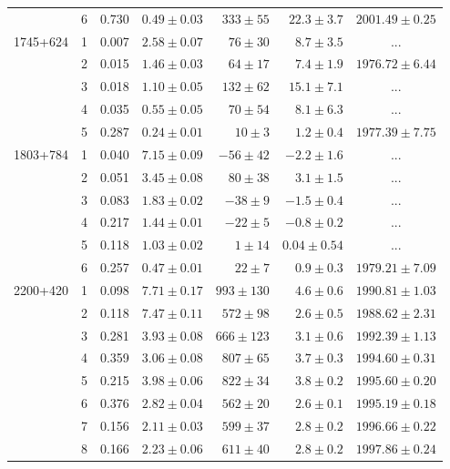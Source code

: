 \begin{table}
\begin{SingleSpace}
\begin{tabular}{l c r r r r c}
         &  6 &  0.730 & $ 0.49\pm 0.03$ & $ 333\pm  55$ & $ 22.3\pm 3.7$ & $2001.49\pm   0.25$ \\
1745+624 &  1 &  0.007 & $ 2.58\pm 0.07$ & $  76\pm  30$ & $  8.7\pm 3.5$ & ... \\
         &  2 &  0.015 & $ 1.46\pm 0.03$ & $  64\pm  17$ & $  7.4\pm 1.9$ & $1976.72\pm   6.44$ \\
         &  3 &  0.018 & $ 1.10\pm 0.05$ & $ 132\pm  62$ & $ 15.1\pm 7.1$ & ... \\
         &  4 &  0.035 & $ 0.55\pm 0.05$ & $  70\pm  54$ & $  8.1\pm 6.3$ & ... \\
         &  5 &  0.287 & $ 0.24\pm 0.01$ & $  10\pm   3$ & $  1.2\pm 0.4$ & $1977.39\pm   7.75$ \\
1803+784 &  1 &  0.040 & $ 7.15\pm 0.09$ & $ -56\pm  42$ & $ -2.2\pm 1.6$ & ... \\
         &  2 &  0.051 & $ 3.45\pm 0.08$ & $  80\pm  38$ & $  3.1\pm 1.5$ & ... \\
         &  3 &  0.083 & $ 1.83\pm 0.02$ & $ -38\pm   9$ & $ -1.5\pm 0.4$ & ... \\
         &  4 &  0.217 & $ 1.44\pm 0.01$ & $ -22\pm   5$ & $ -0.8\pm 0.2$ & ... \\
         &  5 &  0.118 & $ 1.03\pm 0.02$ & $   1\pm  14$ & $  0.04\pm 0.54$ & ... \\
         &  6 &  0.257 & $ 0.47\pm 0.01$ & $  22\pm   7$ & $  0.9\pm 0.3$ & $1979.21\pm   7.09$ \\
2200+420 &  1 &  0.098 & $ 7.71\pm 0.17$ & $ 993\pm 130$ & $  4.6\pm 0.6$ & $1990.81\pm   1.03$ \\
         &  2 &  0.118 & $ 7.47\pm 0.11$ & $ 572\pm  98$ & $  2.6\pm 0.5$ & $1988.62\pm   2.31$ \\
         &  3 &  0.281 & $ 3.93\pm 0.08$ & $ 666\pm 123$ & $  3.1\pm 0.6$ & $1992.39\pm   1.13$ \\
         &  4 &  0.359 & $ 3.06\pm 0.08$ & $ 807\pm  65$ & $  3.7\pm 0.3$ & $1994.60\pm   0.31$ \\
         &  5 &  0.215 & $ 3.98\pm 0.06$ & $ 822\pm  34$ & $  3.8\pm 0.2$ & $1995.60\pm   0.20$ \\
         &  6 &  0.376 & $ 2.82\pm 0.04$ & $ 562\pm  20$ & $  2.6\pm 0.1$ & $1995.19\pm   0.18$ \\
         &  7 &  0.156 & $ 2.11\pm 0.03$ & $ 599\pm  37$ & $  2.8\pm 0.2$ & $1996.66\pm   0.22$ \\
         &  8 &  0.166 & $ 2.23\pm 0.06$ & $ 611\pm  40$ & $  2.8\pm 0.2$ & $1997.86\pm   0.24$ \\

\end{tabular}
\end{SingleSpace}
\end{table}
